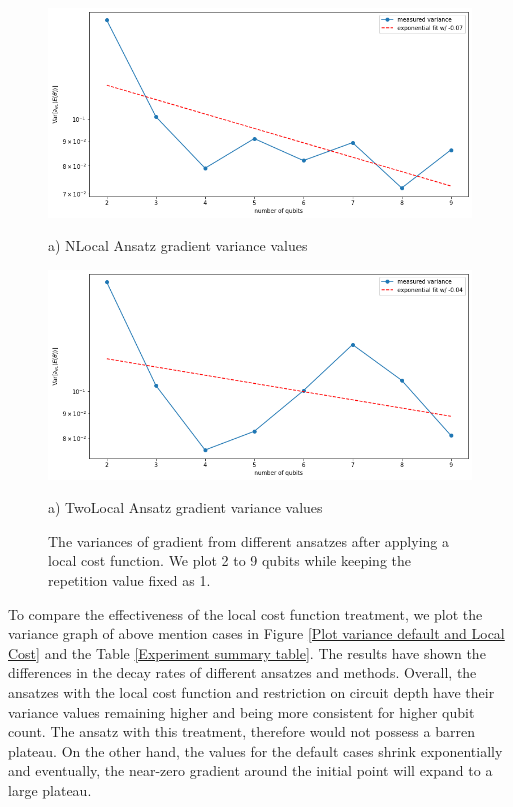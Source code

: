 \begin{figure}
    \includegraphics[width=\textwidth]{Artefact/Appendices/NLocalFixedLocal.png}
    \centerline{a) NLocal Ansatz gradient variance values}
    \includegraphics[width=\textwidth]{Artefact/Appendices/TwoLocalFixedLocal.png}
    \centerline{a) TwoLocal Ansatz gradient variance values}
    \caption{
        The variances of gradient from different ansatzes after applying a local cost function.
        We plot 2 to 9 qubits while keeping the repetition value fixed as 1.
    }
    \label{Plot ansatzes variance local cost}
\end{figure}

To compare the effectiveness of the local cost function treatment, we plot the variance graph of above mention cases in Figure \ref{Plot variance default and Local Cost} and the Table \ref{Experiment summary table}.
The results have shown the differences in the decay rates of different ansatzes and methods.
Overall, the ansatzes with the local cost function and restriction on circuit depth have their variance values remaining higher and being more consistent for higher qubit count. 
The ansatz with this treatment, therefore would not possess a barren plateau.
On the other hand, the values for the default cases shrink exponentially and eventually, the near-zero gradient around the initial point will expand to a large plateau.



